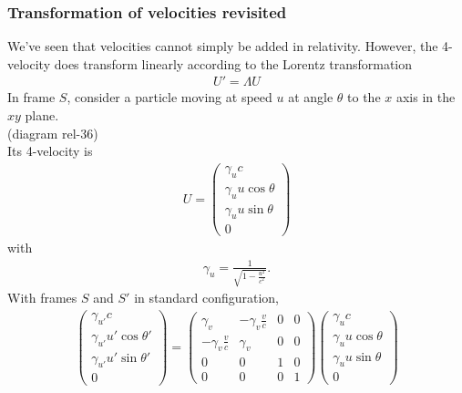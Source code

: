 \documentclass[a4paper]{article}
\begin{document}
\subsubsection{Transformation of velocities revisited}
We've seen that velocities cannot simply be added in relativity. However, the 4-velocity does transform linearly according to the Lorentz transformation
\begin{equation*}
\begin{aligned}
U' = \Lambda U
\end{aligned}
\end{equation*}
In frame $S$, consider a particle moving at speed $u$ at angle $\theta$ to the $x$ axis in the $xy$ plane.\\
(diagram rel-36)\\
Its 4-velocity is
\begin{equation*}
\begin{aligned}
U=\left(\begin{matrix}
\gamma_u c\\
\gamma_u u\cos \theta\\
\gamma_u u\sin \theta\\
0
\end{matrix}\right)
\end{aligned}
\end{equation*}
with
\begin{equation*}
\begin{aligned}
\gamma_u = \frac{1}{\sqrt{1-\frac{u^2}{c^2}}}.
\end{aligned}
\end{equation*}
With frames $S$ and $S'$ in standard configuration,
\begin{equation*}
\begin{aligned}
\left(\begin{matrix}
\gamma_{u'} c\\
\gamma_{u'}u'\cos\theta'\\
\gamma_{u'}u'\sin\theta'\\
0
\end{matrix}\right)
=
\left(\begin{matrix}
\gamma_v & -\gamma_v \frac{v}{c} & 0 & 0\\
-\gamma_v\frac{v}{c} & \gamma_v & 0 & 0\\
0&0&1&0\\
0&0&0&1
\end{matrix}\right)
\left(\begin{matrix}
\gamma_u c\\
\gamma_u u\cos\theta\\
\gamma_u u\sin\theta\\
0
\end{matrix}\right)
\end{aligned}
\end{equation*}
\end{document}
